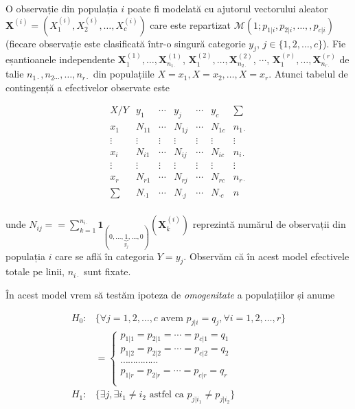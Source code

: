 \documentclass[]{article}
\begin{document}
O observație din populația \(i\) poate fi modelată cu ajutorul
vectorului aleator
\(\mathbf{X}^{(i)} = (X_1^{(i)}, X_2^{(i)}, \ldots, X_c^{(i)})\) care
este repartizat \(\mathcal{M}(1;p_{1|i},p_{2|i},\ldots,,p_{c|i})\)
(fiecare observație este clasificată într-o singură categorie \(y_j\),
\(j\in\{1,2,\ldots,c\}\)). Fie eșantioanele independente
\(\mathbf{X}^{(1)}_1, \ldots, \mathbf{X}^{(1)}_{n_{1\cdot}}\),
\(\mathbf{X}^{(2)}_1, \ldots, \mathbf{X}^{(2)}_{n_{2\cdot}}\),
\(\cdots\),
\(\mathbf{X}^{(r)}_1, \ldots, \mathbf{X}^{(r)}_{n_{r\cdot}}\) de talie
\(n_{1\cdot}, n_{2\cdots}, \ldots, n_{r\cdot}\) din populațiile
\(X = x_1, X = x_2, \ldots, X = x_r\). Atunci tabelul de contingență a
efectivelor observate este

\[
\begin{array}{c|ccccc|c}
  X / Y  &  y_1      & \cdots &  y_j     & \cdots &  y_c     & \sum\\
  \hline
  x_1      &  N_{11} & \cdots & N_{1j} & \cdots & N_{1c} & n_{1\cdot}\\
  \vdots & \vdots  & \vdots & \vdots & \vdots & \vdots & \vdots  \\
  x_i      &  N_{i1} & \cdots & N_{ij} & \cdots & N_{ic} & n_{i\cdot}\\
  \vdots & \vdots  & \vdots & \vdots & \vdots & \vdots & \vdots  \\
  x_r      &  N_{r1} & \cdots & N_{rj} & \cdots & N_{rc} & n_{r\cdot}\\
  \hline
  \sum   &  N_{\cdot 1} & \cdots & N_{\cdot j} & \cdots & N_{\cdot c} & n\\
\end{array}
\]

unde
\(N_{ij} = = \sum_{k = 1}^{n_{i\cdot}}\mathbf{1}_{(0,\ldots, \underbrace{1}_{y_j},\ldots, 0)}(\mathbf{X}^{(i)}_k)\)
reprezintă numărul de observații din populația \(i\) care se află în
categoria \(Y = y_j\). Observăm că în acest model efectivele totale pe
linii, \(n_{i\cdot}\) sunt fixate.

În acest model vrem să testăm ipoteza de \emph{omogenitate} a
populațiilor și anume

\begin{align*}
  H_0: & \{\forall j = 1,2,\ldots, c \text{ avem } p_{j|i} = q_j, \forall i = 1,2,\ldots,r\}\\
    & = \left\{\begin{array}{llll}
      p_{1|1} = p_{2|1} = \cdots = p_{c|1} = q_1\\
      p_{1|2} = p_{2|2} = \cdots = p_{c|2} = q_2\\
      \cdots \cdots \cdots \cdots \cdots \\
      p_{1|r} = p_{2|r} = \cdots = p_{c|r} = q_r\\
    \end{array}\right.\\
  H_1: & \{\exists j, \exists i_1\neq i_2 \text{ astfel ca } p_{j|i_1}\neq p_{j|i_2}\} 
\end{align*}
\end{document}
